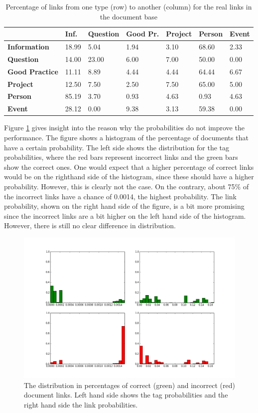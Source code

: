 \begin{table}
\begin{tabular}{| l | l | l | l | l | l | l | }
\hline
 & {\bf Inf. }& {\bf Question }& {\bf Good Pr.} & {\bf Project }&{\bf Person }& {\bf Event} \\
\hline
{\bf Information} &  18.99 & 5.04 & 1.94 & 3.10 & 68.60 & 2.33 \\
{\bf Question} & 14.00 & 23.00 & 6.00 & 7.00 & 50.00 & 0.00 \\
{\bf Good Practice} & 11.11 & 8.89 & 4.44 & 4.44 & 64.44 & 6.67 \\
{\bf Project }& 12.50 & 7.50 & 2.50 & 7.50 & 65.00 & 5.00 \\
{\bf Person} & 85.19 & 3.70 & 0.93 & 4.63 & 0.93 & 4.63 \\
{\bf Event }& 28.12 & 0.00 & 9.38 & 3.13 & 59.38 & 0.00 \\
\hline
\end{tabular}
\caption{Percentage of links from one type (row) to another (column) for the real links in the document base}
\label{bayes_table2}
\end{table}

Figure \ref{distribution} gives insight into the reason why the probabilities do not improve the performance. The figure shows a histogram of the percentage of documents that have a certain probability. The left side shows the distribution for the tag probabilities, where the red bars represent incorrect links and the green bars show the correct ones. One would expect that a higher percentage of correct links would be on the righthand side of the histogram, since these should have a higher probability. However, this is clearly not the case. On the contrary, about 75\% of the incorrect links have a chance of 0.0014, the highest probability. The link probability, shown on the right hand side of the figure, is a bit more promising since the incorrect links are a bit higher on the left hand side of the histogram. However, there is still no clear difference in distribution. 

\begin{figure}
\includegraphics[width =\textwidth]{images/probabilities}
\caption{The distribution in percentages of correct (green) and incorrect (red) document links. Left hand side shows the tag probabilities and the right hand side the link probabilities.}
\label{distribution}
\end{figure}

